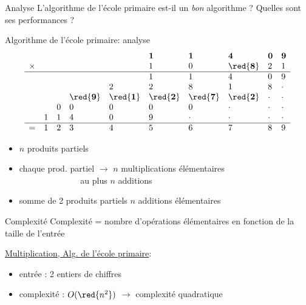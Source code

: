 \begin{frame}{Analyse}
  L'algorithme de l'école primaire est-il un \emph{bon} algorithme ?
  Quelles sont ses performances ?

\end{frame}

\begin{frame}{Algorithme de l'école primaire: analyse}
  $$
   \begin{array}{llllllllll}
     & & & & & \mathbf{1} & \mathbf{1} & \mathbf{4} & \mathbf{0} & \mathbf{9}  \\
     \times & & & & & 1 & 0 & {\red{\mathbf{8}}} & 2 & 1  \\
     \hline
     & & & & & 1 & 1 & 4 & 0 & 9  \\
     & & &   & 2 & 2 & 8 & 1 & 8  & \cdot   \\
     & & & {\red{\mathbf{9}}} & {\red{\mathbf{1}}} & {\red{\mathbf{2}}} & {\red{\mathbf{7}}} & {\red{\mathbf{2}}} & \cdot & \cdot  \\
     & & 0 & 0 & 0 & 0 & 0 & \cdot & \cdot & \cdot  \\
     & 1 & 1 & 4 & 0 & 9 & \cdot & \cdot & \cdot & \cdot  \\
     \hline
     =       & 1 & 2 & 3 & 4 & 5 & 6 & 7 & 8 &  9 \\
   \end{array}
  $$
  \begin{itemize}
  \item $n$ produits partiels
  \item chaque prod. partiel  $\longrightarrow$ $n$ multiplications élémentaires \\
    $~~~~~~~~~~~~~~~~~~~~~~~~~~~~~~~$  au  plus $n$ additions
  \item somme de 2 produits partiels $n$ additions élémentaires 
  \end{itemize}
\end{frame}
\begin{frame}{Complexité}
Complexité = nombre d'opérations élémentaires en fonction de la taille
de l'entrée

\underline{Multiplication, Alg. de l'école primaire}:
\begin{itemize}
\item entrée : 2 entiers de {} chiffres
\item complexité : $O({\red{n^2}})$ $\longrightarrow$ complexité quadratique 
\end{itemize}
\end{frame}

